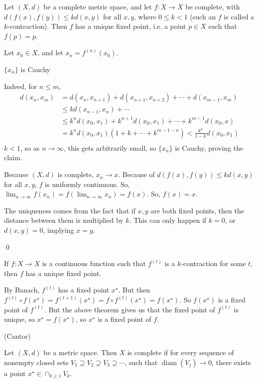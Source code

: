 \documentclass[x11names,reqno,14pt]{extarticle}
\newcommand*{\oo}{{\infty}}
\begin{document}
Let $(X, d)$ be a complete metric space, and let $f:X\to X$ be complete, with $d(f(x), f(y)) \leq kd(x, y)$ for all $x, y$, where $0 \leq k < 1$ (such an $f$ is called a $k$-contraction). Then $f$ has a unique fixed point, i.e. a point $p\in X$ such that $f(p) = p$. 

\proof

Let $x_0 \in X$, and let $x_n = f^{(n)}(x_0)$. 

\claim $\{x_n\}$ is Cauchy

\proof

Indeed, for $n \leq m$, 
\begin{align*}
d(x_n, x_m) & = d(x_n, x_{n + 1}) + d(x_{n + 1}, x_{n + 2}) + \cdots + d(x_{m - 1}, x_m) \\
			   & \leq kd(x_{n - 1}, x_n) + \cdots  \\
			   & \leq k^nd(x_0, x_1) + k^{n + 1}d(x_0, x_1) + \cdots + k^{m - 1}d(x_0, x) \\
				& = k^nd(x_0, x_1)(1 + k + \cdots + k^{m - 1 - n}) < \frac{k^n}{1 - k}d(x_0, x_1) \\
\end{align*}
$k < 1$, so as $n\to\oo$, this gets arbitrarily small, so $\{x_n\}$ is Cauchy, proving the claim. 

Because $(X, d)$ is complete, $x_n\to x$. Because of $d(f(x), f(y)) \leq kd(x, y)$ for all $x, y$, $f$ is uniformly continuous. So, $\lim_{n\to\oo}f(x_n) = f(\lim_{n\to\oo}x_n) = f(x)$. So, $f(x) = x$. 

The uniqueness comes from the fact that if $x, y$ are both fixed points, then the distance between them is multiplied by $k$. This can only happen if $k = 0$, or $d(x, y) = 0$, implying $x = y$. 

\qed

\cor

If $f:X\to X$ is a continuous function such that $f^{(t)}$ is a $k$-contraction for some $t$, then $f$ has a unique fixed point. 

\proof

By Banach, $f^{(t)}$ has a fixed point $x^\star$. But then $f^{(t)}\circ f(x^\star) = f^{(t + 1)}(x^\star) = f \circ f^{(t)}(x^\star) = f(x^\star)$. So $f(x^\star)$ is a fixed point of $f^{(t)}$. But the above theorem gives us that the fixed point of $f^{(t)}$ is unique, so $x^\star = f(x^\star)$, so $x^\star$ is a fixed point of $f$. 

\thm (Cantor)

Let $(X, d)$ be a metric space. Then $X$ is complete if for every sequence of nonempty closed sets $V_1\supseteq V_2 \supseteq V_3 \supseteq \cdots$, such that $\operatorname{diam}(V_j)\to 0$, there exists a point $x^\star \in \cap_{k\geq1}V_k$. 
\end{document}
